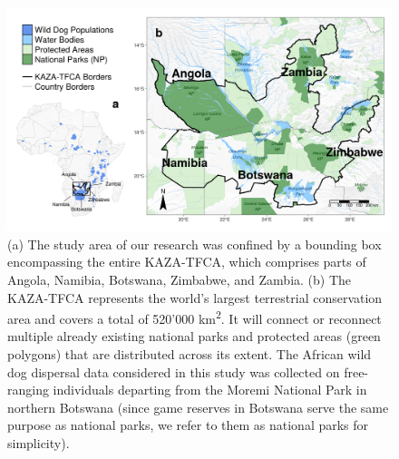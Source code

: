 \documentclass[abstract=on,10pt,a4paper,bibliography=totocnumbered]{article}
\begin{document}
\begin{figure}[htbp]
  \begin{center}
    \includegraphics[width = \textwidth]{99_StudyArea.png}
    \caption{(a) The study area of our research was confined by a bounding box
    encompassing the entire KAZA-TFCA, which comprises parts of Angola, Namibia,
    Botswana, Zimbabwe, and Zambia. (b) The KAZA-TFCA represents the world's
    largest terrestrial conservation area and covers a total of 520'000
    km\textsuperscript{2}. It will connect or reconnect multiple already
    existing national parks and protected areas (green polygons) that are
    distributed across its extent. The African wild dog dispersal data
    considered in this study was collected on free-ranging individuals departing
    from the Moremi National Park in northern Botswana (since game reserves in
    Botswana serve the same purpose as national parks, we refer to them as
    national parks for simplicity).}
    \label{StudyArea}
  \end{center}
\end{figure}
\end{document}
